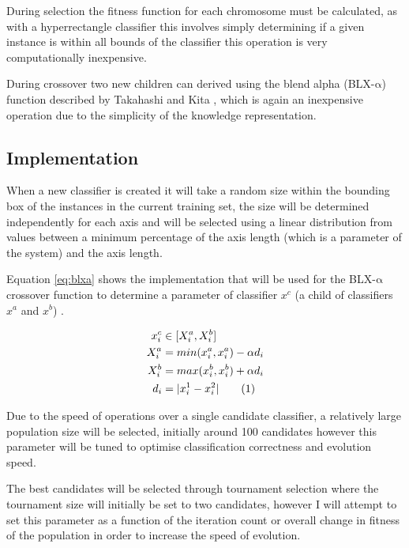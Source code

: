 \documentclass[a4paper]{article}
\newcommand\numberthis{\addtocounter{equation}{1}\tag{\theequation}}
\begin{document}
During selection the fitness function for each chromosome must be calculated, as
with a hyperrectangle classifier this involves simply determining if a given
instance is within all bounds of the classifier this operation is very
computationally inexpensive.

During crossover two new children can derived using the blend alpha
(BLX-$\mathrm{\alpha}$) function described by Takahashi and Kita \cite{blxa},
which is again an inexpensive operation due to the simplicity of the knowledge
representation.

\subsection{Implementation}

When a new classifier is created it will take a random size within the bounding
box of the instances in the current training set, the size will be determined
independently for each axis and will be selected using a linear distribution
from values between a minimum percentage of the axis length (which is a
parameter of the system) and the axis length.

Equation \ref{eq:blxa} shows the implementation that will be used for the
BLX-$\mathrm{\alpha}$ crossover function to determine a parameter of classifier
$x^{c}$ (a child of classifiers $x^{a}$ and $x^{b}$) \cite{blxa}.

\begin{align*}
  x^{c}_{i} &\in [X^{a}_{i}, X^{b}_{i}] \\
  X^{a}_{i} &= min(x^{a}_{i}, x^{a}_{i}) - \alpha d_{i} \\
  X^{b}_{i} &= max(x^{b}_{i}, x^{b}_{i}) + \alpha d_{i} \\
  d_{i} &= |x^{1}_{i} - x^{2}_{i}|
  \numberthis
  \label{eq:blxa}
\end{align*}

Due to the speed of operations over a single candidate classifier, a relatively
large population size will be selected, initially around 100 candidates however
this parameter will be tuned to optimise classification correctness and
evolution speed.

The best candidates will be selected through tournament selection where the
tournament size will initially be set to two candidates, however I will attempt
to set this parameter as a function of the iteration count or overall change in
fitness of the population in order to increase the speed of evolution.
\end{document}
